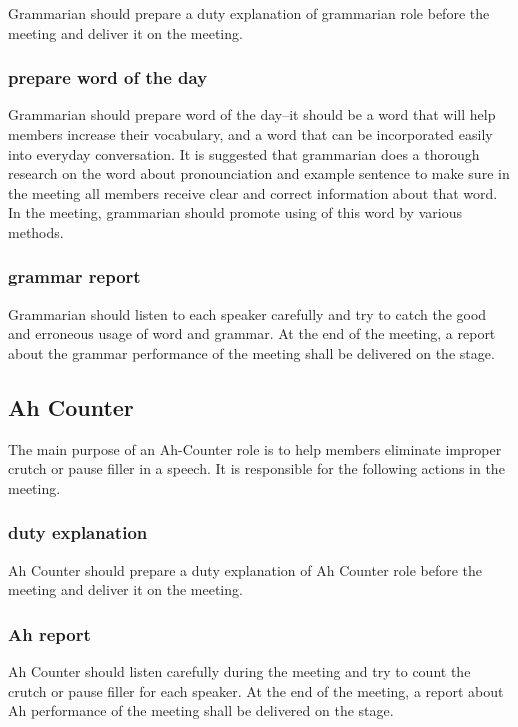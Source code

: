 Grammarian should prepare a duty explanation of grammarian role before the meeting and 
deliver it on the meeting.

\subsubsection{prepare word of the day}

Grammarian should prepare word of the day--it should be a word that will help members 
increase their vocabulary, and a word that can be incorporated easily into everyday
conversation. It is suggested that grammarian does a thorough research on the word about
pronounciation and example sentence to make sure in the meeting all members receive  
clear and correct information about that word. In the meeting, grammarian should promote
using of this word by various methods.

\subsubsection{grammar report}

Grammarian should listen to each speaker carefully and try to catch the good and erroneous 
usage of word and grammar. At the end of the meeting, a report about the grammar performance
of the meeting shall be delivered on the stage.

\subsection{Ah Counter}

The main purpose of an Ah-Counter role is to help members eliminate improper crutch or pause 
filler in a speech. It is responsible for the following actions in the meeting.

\subsubsection{duty explanation}
Ah Counter should prepare a duty explanation of Ah Counter role before the meeting and 
deliver it on the meeting.

\subsubsection{Ah report}
Ah Counter should listen carefully during the meeting and try to count the crutch or 
pause filler for each speaker. At the end of the meeting, a report about Ah 
performance of the meeting shall be delivered on the stage.

